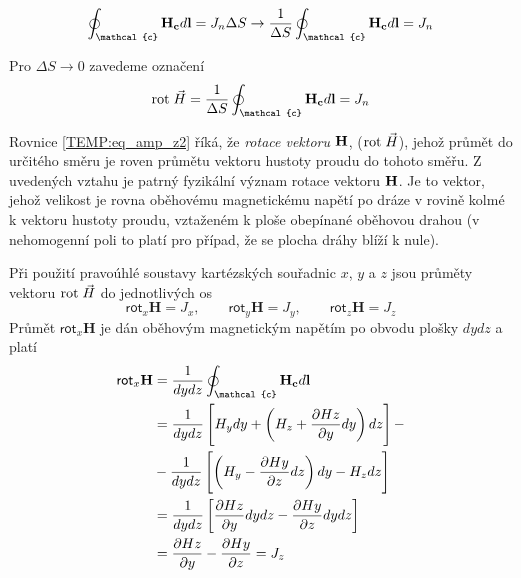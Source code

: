       \begin{equation}\label{TEMP:eq_amp_z1}
        \oint_\mathcal{c}\vr{H_c}d\vr{l}  =
           J_n \Delta S \rightarrow \frac{1}{\Delta S}\oint_\mathcal{c}\vr{H_c}d\vr{l} = J_n
      \end{equation} 
      
      Pro $\Delta S \rightarrow 0$ zavedeme označení 
      \begin{equation}\label{TEMP:eq_amp_z2}
        \rot{H}  = \frac{1}{\Delta S}\oint_\mathcal{c}\vr{H_c}d\vr{l}  = J_n
      \end{equation}
      
      Rovnice \ref{TEMP:eq_amp_z2} říká, že \emph{rotace vektoru} $\mathbf{H}$, ($\mathrm{rot}\;\vec{H}$), jehož
      průmět do určitého směru je roven průmětu vektoru hustoty proudu do tohoto směřu. Z uvedených
      vztahu je patrný fyzikální význam rotace vektoru $\mathbf{H}$. Je to vektor, jehož velikost je
      rovna oběhovému magnetickému napětí po dráze v rovině kolmé k vektoru hustoty proudu,
      vztaženém k ploše obepínané oběhovou drahou (v nehomogenní poli to platí pro případ, že se
      plocha dráhy blíží k nule).
      
      Při použití pravoúhlé soustavy kartézských souřadnic $x$, $y$ a $z$ jsou průměty vektoru
      $\mathrm{rot}\;\vec{H}$ do jednotlivých os
      \begin{equation}\label{TEMP:eq_amp_z3}
        \textsf{rot}_x\mathbf{H} = J_x, \qquad 
        \textsf{rot}_y\mathbf{H} = J_y, \qquad
        \textsf{rot}_z\mathbf{H} = J_z
      \end{equation}      
      Průmět $\textsf{rot}_x\mathbf{H}$ je dán oběhovým magnetickým napětím po obvodu plošky $dydz$
      a platí
      \begin{align}\label{TEMP:eq_amp_z4}
        \textsf{rot}_x\mathbf{H} 
          &= \frac{1}{dydz}\oint_\mathcal{c}\vr{H_c}d\vr{l}                   \nonumber \\
          &= \frac{1}{dydz}\left[H_ydy + 
                           \left(H_z + \pder{Hz}{y}dy\right)dz\right] -       \nonumber \\
          &- \frac{1}{dydz}\left[\left(H_y - 
                           \pder{Hy}{z}dz\right)dy - H_zdz\right]             \nonumber \\
          &= \frac{1}{dydz}\left[\pder{Hz}{y}dydz - \pder{Hy}{z}dydz\right]   \nonumber \\
          &= \pder{Hz}{y} - \pder{Hy}{z} = J_z
      \end{align}       
      
